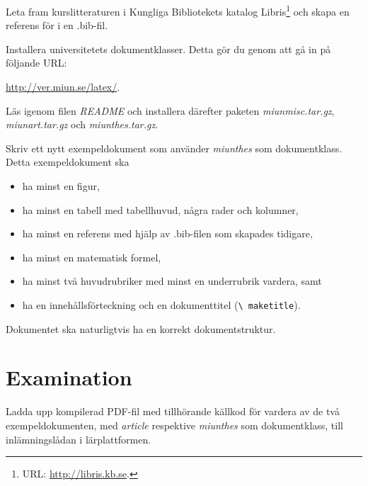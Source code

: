 \documentclass[a4paper]{miunasgn}
\begin{document}
Leta fram kurslitteraturen i Kungliga Bibliotekets katalog Libris\footnote{%
	URL: \url{http://libris.kb.se}.
} och skapa en referens för \BibTeX i en .bib-fil.

Installera universitetets dokumentklasser.
Detta gör du genom att gå in på följande URL:
\begin{center}
	\url{http://ver.miun.se/latex/}.
\end{center}
Läs igenom filen \emph{README} och installera därefter paketen 
\emph{miunmisc.tar.gz}, \emph{miunart.tar.gz} och \emph{miunthes.tar.gz}.

Skriv ett nytt exempeldokument som använder \emph{miunthes} som dokumentklass.
Detta exempeldokument ska
\begin{itemize}
	\item ha minst en figur,
	\item ha minst en tabell med tabellhuvud, några rader och kolumner,
	\item ha minst en referens med hjälp av .bib-filen som skapades tidigare,
	\item ha minst en matematisk formel,
	\item ha minst två huvudrubriker med minst en underrubrik vardera, samt
	\item ha en innehållsförteckning och en dokumenttitel (\texttt{\textbackslash 
		maketitle}).
\end{itemize}
Dokumentet ska naturligtvis ha en korrekt dokumentstruktur.


\section{Examination}
\label{sec:Examination}
\noindent
Ladda upp kompilerad PDF-fil med tillhörande källkod för vardera av de två 
exempeldokumenten, med \emph{article} respektive \emph{miunthes} som 
dokumentklass, till inlämningslådan i lärplattformen.



\end{document}
